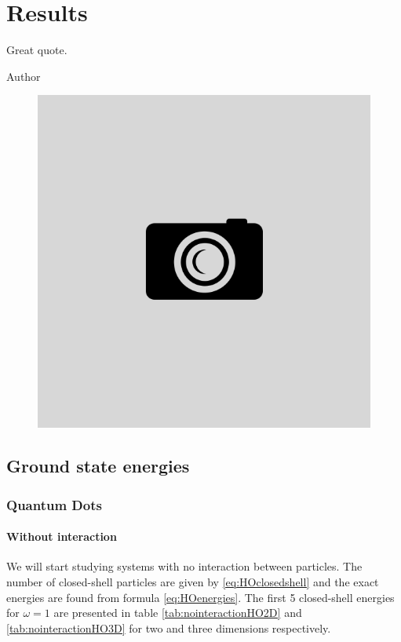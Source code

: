 \chapter{Results} \label{sec:results}
\epigraph{Great quote.}{Author}
\begin{figure}[H]
	\centering
	\includegraphics[scale=0.4]{Images/example.png}
	\caption{}
\end{figure}

\section{Ground state energies}
\subsection{Quantum Dots}
\subsubsection{Without interaction}
We will start studying systems with no interaction between particles. The number of closed-shell particles are given by \eqref{eq:HOclosedshell} and the exact energies are found from formula \eqref{eq:HOenergies}. The first 5 closed-shell energies for $\omega=1$ are presented in table \eqref{tab:nointeractionHO2D} and \eqref{tab:nointeractionHO3D} for two and three dimensions respectively.

